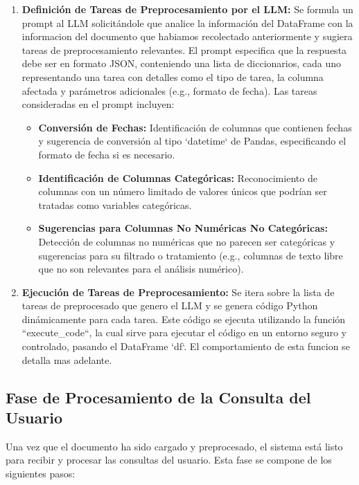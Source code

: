 \begin{enumerate}
	\item \textbf{Definición de Tareas de Preprocesamiento por el LLM:} Se formula un prompt al LLM solicitándole que analice la información del DataFrame con la informacion del documento que habiamos recolectado anteriormente y sugiera tareas de preprocesamiento relevantes.  El prompt especifica que la respuesta debe ser en formato JSON,  conteniendo una lista de diccionarios, cada uno representando una tarea con detalles como el tipo de tarea, la columna afectada y parámetros adicionales (e.g., formato de fecha).  Las tareas consideradas en el prompt incluyen:
	\begin{itemize}
		\item \textbf{Conversión de Fechas:}  Identificación de columnas que contienen fechas y sugerencia de conversión al tipo `datetime` de Pandas, especificando el formato de fecha si es necesario.
		\item \textbf{Identificación de Columnas Categóricas:}  Reconocimiento de columnas con un número limitado de valores únicos que podrían ser tratadas como variables categóricas.
		\item \textbf{Sugerencias para Columnas No Numéricas No Categóricas:}  Detección de columnas no numéricas que no parecen ser categóricas y sugerencias para su filtrado o tratamiento (e.g., columnas de texto libre que no son relevantes para el análisis numérico).
	\end{itemize}
	
	\item \textbf{Ejecución de Tareas de Preprocesamiento:}  Se itera sobre la lista de tareas de preprocesado que genero el LLM y se genera código Python dinámicamente para cada tarea.  Este código se ejecuta utilizando la función ``execute\_code``, la cual sirve para ejecutar el código en un entorno seguro y controlado, pasando el DataFrame `df`. El comportamiento de esta funcion se detalla mas adelante.
\end{enumerate}

\subsection{Fase de Procesamiento de la Consulta del Usuario}

Una vez que el documento ha sido cargado y preprocesado, el sistema está listo para recibir y procesar las consultas del usuario. Esta fase se compone de los siguientes pasos:

